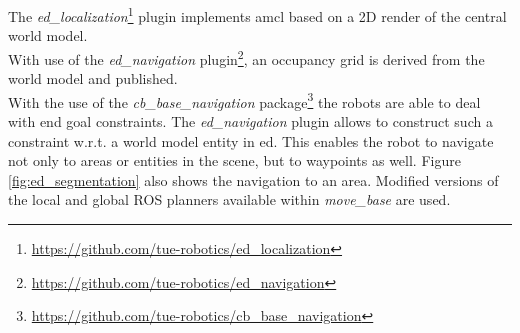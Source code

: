 The \emph{ed\_localization}\footnote{\url{https://github.com/tue-robotics/ed_localization}} plugin implements \acrshort{amcl} based on a 2D render of the central world model.
\\
With use of the \emph{ed\_navigation} plugin\footnote{\url{https://github.com/tue-robotics/ed_navigation}}, an occupancy grid is derived from the world model and published.
\\
With the use of the \emph{cb\_base\_navigation} package\footnote{\url{https://github.com/tue-robotics/cb_base_navigation}} the robots are able to deal with end goal constraints. The \emph{ed\_navigation} plugin allows to construct such a constraint w.r.t. a world model entity in \acrshort{ed}. This enables the robot to navigate not only to areas or entities in the scene, but to waypoints as well. Figure \ref{fig:ed_segmentation} also shows the navigation to an area.
Modified versions of the local and global ROS planners available within \emph{move\_base} are used.
